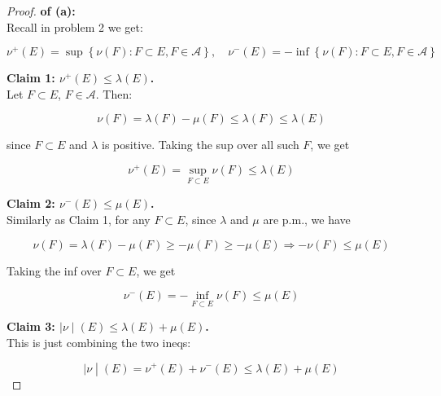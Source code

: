 \documentclass{qlnotes-export}
\begin{document}
\begin{proof}

\textbf{of (a):}\\
Recall in problem 2 we get:

\[\nu^{+}(E) = \sup\left\{ {\nu(F):F \subset E,F \in \mathcal{A}} \right\},\quad\nu^{-}(E) = - \inf\left\{ {\nu(F):F \subset E,F \in \mathcal{A}} \right\}\]

\textbf{Claim 1: \(\nu^{+}(E) \leq \lambda(E)\).}\\
Let \(F \subset E\), \(F \in \mathcal{A}\). Then:

\[\nu(F) = \lambda(F) - \mu(F) \leq \lambda(F) \leq \lambda(E)\]

since \(F \subset E\) and \(\lambda\) is positive. Taking the sup over all such \(F\), we get

\[\nu^{+}(E) = \sup\limits_{F \subset E}\nu(F) \leq \lambda(E)\]

\textbf{Claim 2: \(\nu^{-}(E) \leq \mu(E)\).}\\
Similarly as Claim 1, for any \(F \subset E\), since \(\lambda\) and \(\mu\) are p.m., we have

\[\nu(F) = \lambda(F) - \mu(F) \geq - \mu(F) \geq - \mu(E)\Longrightarrow - \nu(F) \leq \mu(E)\]

Taking the inf over \(F \subset E\), we get

\[\nu^{-}(E) = - \inf\limits_{F \subset E}\nu(F) \leq \mu(E)\]

\textbf{Claim 3: \(\left. |\nu \middle| (E) \leq \lambda(E) + \mu(E) \right.\).}\\
This is just combining the two ineqs:

\[\left. |\nu \middle| (E) = \nu^{+}(E) + \nu^{-}(E) \leq \lambda(E) + \mu(E) \right.\]

\end{proof}
\end{document}
